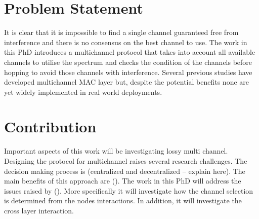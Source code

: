 
\section{Problem Statement}
It is clear that it is impossible to find a single channel guaranteed free from interference and there is no consensus on the best channel to use. The work in this PhD introduces a multichannel protocol that takes into account all available channels to utilise the spectrum and checks the condition of the channels before hopping to avoid those channels with interference. Several previous studies have developed multichannel MAC layer but, despite the potential benefits none are yet widely implemented in real world deployments.

\section{Contribution}
Important aspects of this work will be investigating lossy multi channel. Designing the protocol for multichannel raises several research challenges. The decision making process is (centralized and decentralized – explain here). The main benefits of this approach are (). 
The work in this PhD will address the issues raised by (). More specifically it will investigate how the channel selection is determined from the nodes interactions. In addition, it will investigate the cross layer interaction. 

